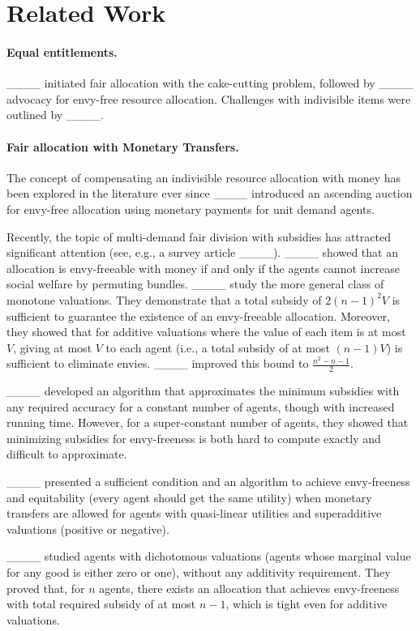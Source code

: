 \section{Related Work}
\label{sec:related_work}
 \paragraph{\textbf{Equal entitlements.}}
 ____ initiated fair allocation with the cake-cutting problem, followed by ____ advocacy for envy-free resource allocation. Challenges with indivisible items were outlined by ____. 
 
 \paragraph{\textbf{Fair allocation with Monetary Transfers.}}
 The concept of compensating an indivisible resource allocation with money has been explored in the literature ever since 
 ____ introduced an ascending auction for envy-free allocation using monetary payments for unit demand agents.
 
 Recently, the topic of multi-demand fair division with subsidies has attracted significant attention (see, e.g., a survey article ____).
 ____ showed that
 an allocation is envy-freeable with money if and only if the agents cannot increase
 social welfare by permuting bundles.
 ____ study the more general class of monotone valuations. They demonstrate that a total subsidy of $2(n-1)^2   V$ is sufficient to guarantee the existence of an envy-freeable allocation. Moreover, they showed that 
 for additive valuations where the value of each item is at most $V$,
 giving at most $V$ to each agent (i.e., a total subsidy of at most $(n-1)V$) is sufficient to eliminate envies.
 ____ improved this bound to $\frac{n^2 - n - 1}{2}$.
 
 ____ developed an algorithm that approximates the minimum subsidies with any required accuracy for a constant number of agents, though with increased running time. However, for a super-constant number of agents, they showed that minimizing subsidies for envy-freeness is both hard to compute exactly and difficult to approximate.
 
 ____ presented a sufficient condition and an algorithm to achieve envy-freeness and equitability (every agent should get the same utility) when monetary transfers are allowed for agents with quasi-linear utilities and superadditive valuations (positive or negative).
 
 ____ studied agents with  dichotomous valuations (agents whose marginal value for any good is either zero or one), without any additivity requirement.
 They proved that, for $n$ agents, there exists an allocation that achieves envy-freeness with total required subsidy of at most $n-1$, which is tight even for additive valuations.
 

